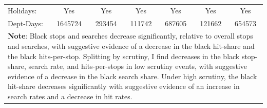 \begin{tabular}{l*{6}{c}}
Holidays:   &         Yes         &         Yes         &         Yes         &         Yes         &         Yes         &         Yes         \\
Dept-Days:  &     1645724         &      293454         &      111742         &      687605         &      121662         &      654573         \\
\hline \multicolumn{7}{p{\linewidth}}{\textbf{Note}: Black stops and searches decrease significantly, relative to overall stops and searches, with suggestive evidence of a decrease in the black hit-share and the black hits-per-stop. Splitting by scrutiny, I find decreases in the black stop-share, search rate, and hits-per-stops in low scrutiny events, with suggestive evidence of a decrease in the black search share. Under high scrutiny, the black hit-share decreases significantly with suggestive evidence of an increase in search rates and a decrease in hit rates.} \\ \hline \end{tabular}
